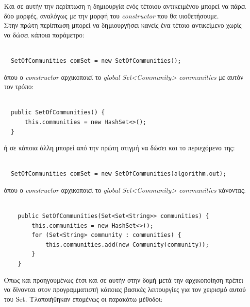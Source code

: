 Και σε αυτήν την περίπτωση η δημιουργία ενός τέτοιου αντικειμένου μπορεί να πάρει δύο μορφές, αναλόγως με την μορφή
του \emph{constructor} που θα υιοθετήσουμε. \\

  
Στην πρώτη περίπτωση μπορεί να δημιουργήσει κανείς ένα τέτοιο αντικείμενο χωρίς να δώσει κάποια παράμετρο: 


\begin{lstlisting}[frame=single]  % Start your code-block

  SetOfCommunities comSet = new SetOfCommunities();
\end{lstlisting}
 
  
  όπου ο \emph{constructor} αρχικοποιεί το \emph{global Set<Community> communities} με αυτόν τον τρόπο:
  
\begin{lstlisting}[frame=single]  % Start your code-block

  public SetOfCommunities() {
      this.communities = new HashSet<>();
  }
\end{lstlisting}
 
  ή σε κάποια άλλη μπορεί από την πρώτη στιγμή να δώσει και το περιεχόμενο της:
\begin{lstlisting}[frame=single]  % Start your code-block

  SetOfCommunities comSet = new SetOfCommunities(algorithm.out);
\end{lstlisting}

   
  όπου ο \emph{constructor} αρχικοποιεί το \emph{global Set<Community> communities} κάνοντας:
  
\begin{lstlisting}[frame=single]  % Start your code-block

    public SetOfCommunities(Set<Set<String>> communities) {
        this.communities = new HashSet<>();
        for (Set<String> community : communities) {
            this.communities.add(new Community(community));            
        }
    }
\end{lstlisting}
  
 
Όπως και προηγουμένως έτσι και σε αυτήν στην δομή μετά την αρχικοποίηση πρέπει να δίνονται στον προγραμματιστή
κάποιες βασικές λειτουργίες για τον χειρισμό αυτού του Set.
Υλοποιήθηκαν επομένως οι παρακάτω μέθοδοι:

